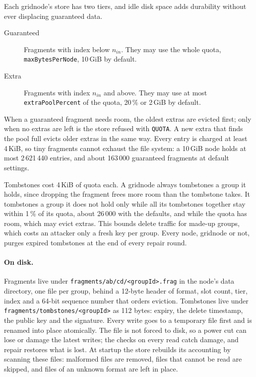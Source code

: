 \documentclass[10pt,a4paper,final]{article}
\newcommand{\code}[1]{\texttt{#1}}
\begin{document}
Each gridnode's store has two tiers, and idle disk space adds durability without ever displacing guaranteed data.

\begin{description}
	\item[Guaranteed] Fragments with index below $n_{in}$. They may use the whole quota, \code{maxBytesPerNode},
	      10\,GiB by default.
	\item[Extra] Fragments with index $n_{in}$ and above. They may use at most \code{extraPoolPercent} of the quota,
	      20\,\% or 2\,GiB by default.
\end{description}

When a guaranteed fragment needs room, the oldest extras are evicted first; only when no extras are left is the store
refused with \code{QUOTA}. A new extra that finds the pool full evicts older extras in the same way. Every entry is
charged at least 4\,KiB, so tiny fragments cannot exhaust the file system: a 10\,GiB node holds at most
2\,621\,440 entries, and about 163\,000 guaranteed fragments at default settings.

Tombstones cost 4\,KiB of quota each. A gridnode always tombstones a group it holds, since dropping the fragment frees
more room than the tombstone takes. It tombstones a group it does not hold only while all its tombstones together
stay within 1\,\% of its quota, about 26\,000 with the defaults, and while the quota has room, which may evict extras.
This bounds delete traffic for made-up groups, which costs an attacker only a fresh key per group. Every node, gridnode
or not, purges expired tombstones at the end of every repair round.

\paragraph{On disk.} Fragments live under \code{fragments/ab/cd/<groupId>.frag} in the node's data directory, one file
per group, behind a 12-byte header of format, slot count, tier, index and a 64-bit sequence number that orders
eviction. Tombstones live under \code{fragments/tombstones/<groupId>} as 112 bytes: expiry, the delete timestamp,
the public key and the signature. Every write goes to a temporary file first and is renamed into place atomically.
The file is not forced to disk, so a power cut can lose or damage the latest writes; the checks on every read catch
damage, and repair restores what is lost. At startup the store rebuilds its accounting by scanning these files:
malformed files are removed, files that cannot be read are skipped, and files of an unknown format are left in
place.
\end{document}
